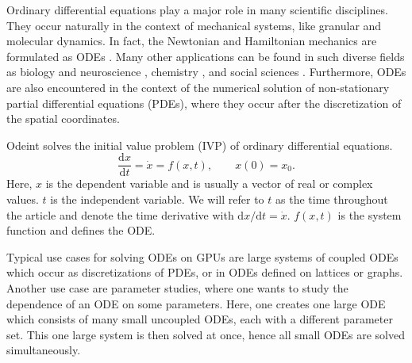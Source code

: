 \documentclass[final]{siamltex}
\newcommand {\de} {\mbox{d}}
\begin{document}
Ordinary differential equations play a major role in many scientific
disciplines. They occur naturally in the context of mechanical
systems, like granular \cite{poschel_computational_2005} and molecular dynamics. In fact, the Newtonian
and Hamiltonian mechanics are formulated as ODEs
\cite{landau_mechanics_1976}.  Many other applications can be found in
such diverse fields as biology
\cite{brauer_mathematical_2001,Murray-93} and neuroscience
\cite{izhikevich_dynamical_2006}, chemistry
\cite{atkins_physical_2001}, and social sciences
\cite{Helbing01}. Furthermore, ODEs are also encountered in the
context of the numerical solution of non-stationary partial
differential equations (PDEs), where they occur after the
discretization of the spatial coordinates.


Odeint solves %
the initial value problem (IVP) of ordinary differential equations.
\begin{equation}
\frac{\de x}{\de t } = \dot{x} = f(x , t), \quad \quad x(0) =
x_0.
\label{eq:ode}
\end{equation}
Here, $x$ is the dependent variable and is usually a vector of real or complex values.
$t$ is the independent variable. We will refer to $t$ as the time throughout the article and
denote the time derivative with $\de x / \de t = \dot{x}$. $f(x,t)$ is
the system function and defines the ODE.

Typical use cases for solving ODEs on GPUs are large systems of
coupled ODEs which occur as discretizations of PDEs, or in ODEs
defined on lattices or graphs. Another use case are parameter studies,
where one wants to study the dependence of an ODE on some
parameters. Here, one creates one large ODE which consists of many
small uncoupled ODEs, each with a different parameter set. This one
large system is then solved at once, hence all small ODEs are solved
simultaneously.
\end{document}
